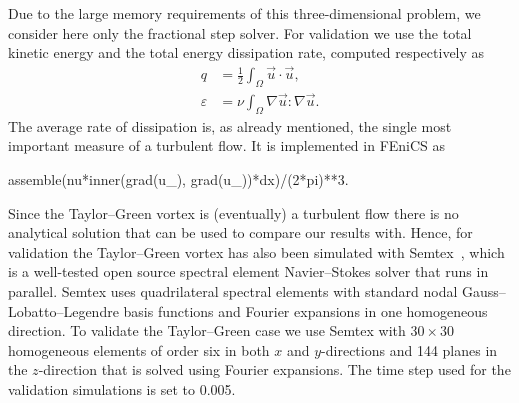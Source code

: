Due to the large memory requirements of this three-dimensional
problem, we consider here only the fractional step solver. For validation
we use the total kinetic energy and the total energy dissipation rate,
computed respectively as
\begin{align}
 q &= \frac{1}{2} \int_{\Omega} \vec{u} \cdot \vec{u}, \label{eq:mortensen:q}
\\
 \varepsilon &= \nu \int_{\Omega} \nabla \vec{u}: \nabla \vec{u}. \label{eq:mortensen:diss}
\end{align}
The average rate of dissipation is, as already mentioned, the single
most important measure of a turbulent flow. It is implemented in FEniCS as
\begin{python}
assemble(nu*inner(grad(u_), grad(u_))*dx)/(2*pi)**3.
\end{python}

Since the Taylor--Green vortex is (eventually) a turbulent flow there
is no analytical solution that can be used to compare our results
with. Hence, for validation the Taylor--Green vortex has also been
simulated with Semtex~\citep{Blackburn2009}, which is a well-tested
open source spectral element Navier--Stokes solver that runs in
parallel. Semtex uses quadrilateral spectral elements with standard
nodal Gauss--Lobatto--Legendre basis functions and Fourier expansions
in one homogeneous direction. To validate the Taylor--Green case we
use Semtex with $30 \times 30$ homogeneous elements of order six in both $x$
and $y$-directions and 144 planes in the $z$-direction that is solved
using Fourier expansions. The time step used for the validation simulations
is set to 0.005.

